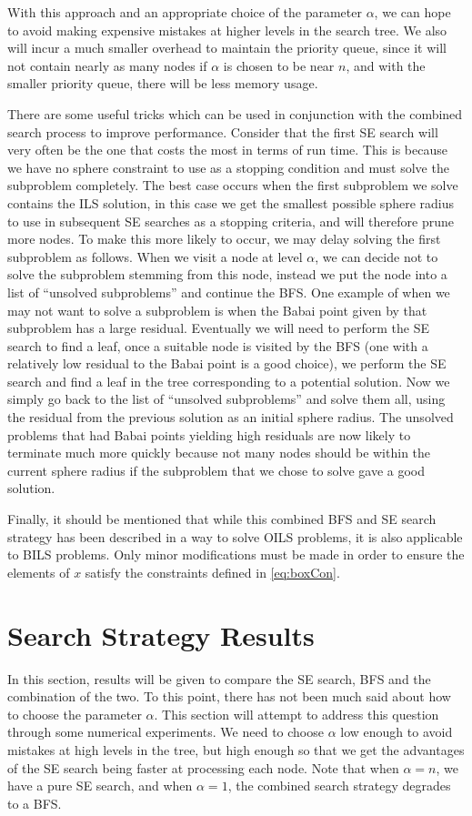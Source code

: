 \documentclass[12pt,Bold,letterpaper]{mcgilletdclass}
\newcommand{\vsp}{\vspace{\baselineskip}}
\begin{document}
With this approach and an appropriate choice of the parameter $\alpha$, we can hope to avoid making expensive mistakes at higher levels in the search tree. We also will incur a much smaller overhead to maintain the priority queue, since it will not contain nearly as many nodes if $\alpha$ is chosen to be near $n$, and with the smaller priority queue, there will be less memory usage. 

There are some useful tricks which can be used in conjunction with the combined search process to improve performance. Consider that the first SE search will very often be the one that costs the most in terms of run time. This is because we have no sphere constraint to use as a stopping condition and must solve the subproblem completely. The best case occurs when the first subproblem we solve contains the ILS solution, in this case we get the smallest possible sphere radius to use in subsequent SE searches as a stopping criteria, and will therefore prune more nodes. To make this more likely to occur, we may delay solving the first subproblem as follows. When we visit a node at level $\alpha$, we can decide not to solve the subproblem stemming from this node, instead we put the node into a list of ``unsolved subproblems'' and continue the BFS. One example of when we may not want to solve a subproblem is when the Babai point given by that subproblem has a large residual. Eventually we will need to perform the SE search to find a leaf, once a suitable node is visited by the BFS (one with a relatively low residual to the Babai point is a good choice), we perform the SE search and find a leaf in the tree corresponding to a potential solution. Now we simply go back to the list of ``unsolved subproblems'' and solve them all, using the residual from the previous solution as an initial sphere radius. The unsolved problems that had Babai points yielding high residuals are now likely to terminate much more quickly because not many nodes should be within the current sphere radius if the subproblem that we chose to solve gave a good solution.

Finally, it should be mentioned that while this combined BFS and SE search strategy has been described in a way to solve OILS problems, it is also applicable to BILS problems. Only minor modifications must be made in order to ensure the elements of $x$ satisfy the constraints defined in \ref{eq:boxCon}.

\vsp \section{Search Strategy Results} \label{sub:SearchResults}
In this section, results will be given to compare the SE search, BFS and the combination of the two. To this point, there has not been much said about how to choose the parameter $\alpha$. This section will attempt to address this question through some numerical experiments. We need to choose $\alpha$ low enough to avoid mistakes at high levels in the tree, but high enough so that we get the advantages of the SE search being faster at processing each node. Note that when $\alpha = n$, we have a pure SE search, and when $\alpha = 1$, the combined search strategy degrades to a BFS. 
\end{document}
